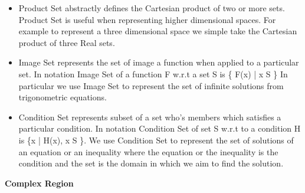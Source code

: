 \begin{itemize}

    \item Product Set abstractly defines the Cartesian product of two or more
sets. Product Set is useful when representing higher dimensional spaces. For
example to represent a three dimensional space we simple take the Cartesian
product of three Real sets.

    \item Image Set represents the set of image a function when applied to a
particular set. In notation Image Set of a function F w.r.t a set S is \{ F(x)
| x \in S \} In particular we use Image Set to represent the set of infinite
solutions from trigonometric equations.


    \item Condition Set represents subset of a set who's members which
satisfies a particular condition. In notation Condition Set of set S w.r.t to a
condition H is \{x | H(x), x \in S \}. We use Condition Set to represent the
set of solutions of an equation or an inequality where the equation or the
inequality is the condition and the set is the domain in which we aim to find
the solution.


\end{itemize}






    \textbf{Complex Region}




